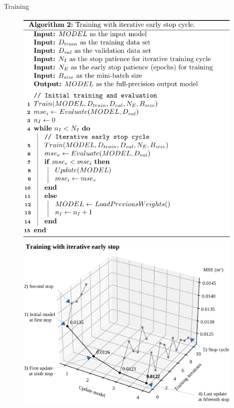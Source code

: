 \begin{frame}{Training}
	\begin{figure}
		\begin{minipage}[c]{0.48\linewidth}
			\includegraphics[width=0.6\linewidth]{slides/algorithm_early_stop_1.pdf} %
			\pause %
		\end{minipage}
		\hfill
		\begin{minipage}[c]{0.48\linewidth}
			\includegraphics[width=0.6\linewidth]{slides/figures/training_iterative_early_stop.pdf} %
			\pause %
		\end{minipage}
		
		\vspace{0.5cm} %
		

\end{figure}
\end{frame}
